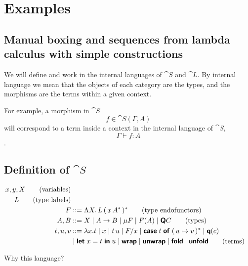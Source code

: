 \section{Examples}\label{sec:examples}

\subsection{Manual boxing and sequences from lambda calculus with simple constructions}

We will define and work in the internal languages of $\cat S$ and $\cat L$. By
internal language we mean that the objects of each category are the types, and
the morphisms are the terms within a given context.

For example, a morphism in $\cat S$ $$ f \in \cat S (\Gamma, A) $$ will
correspond to a term inside a context in the internal language of $\cat S$, $$
  \Gamma \vdash f : A $$.

\subsection{Definition of $\cat S$}

\begin{align*}
  x,y, X  \tag{variables}                                                                                            \\
  L  \tag{type labels}                                                                                               \\
  F       & ::= \Lambda X .  \, L \, (\, x \, A^* \,)^* \tag{type endofunctors}                                      \\
  A, B    & ::= X \mid A \to B \mid \mu F \mid F(A)  \mid \textsf{\textbf{Q}} C \tag{types}                                     \\
  t, u, v & ::= \lambda x . t \mid x \mid t\,u \mid F / x \mid \textsf{\textbf{case}}\; {t}\; \textsf{\textbf{of}}\; (\, {u} \mapsto {v} \,)^* \mid \textsf{\textbf{q}}(c) \\
          & \mid \textsf{\textbf{let}}\; {x} = {t}\; \textsf{\textbf{in}}\; {u} \mid \textsf{\textbf{wrap}} \mid \textsf{\textbf{unwrap}} \mid \textsf{\textbf{fold}} \mid \textsf{\textbf{unfold}} \tag{terms}
\end{align*}

Why this language?

